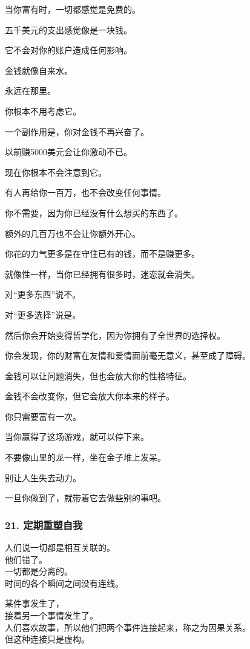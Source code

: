 \documentclass[
]{article}
\begin{document}
当你富有时，一切都感觉是免费的。

五千美元的支出感觉像是一块钱。

它不会对你的账户造成任何影响。

金钱就像自来水。

永远在那里。

你根本不用考虑它。

一个副作用是，你对金钱不再兴奋了。

以前赚5000美元会让你激动不已。

现在你根本不会注意到它。

有人再给你一百万，也不会改变任何事情。

你不需要，因为你已经没有什么想买的东西了。

额外的几百万也不会让你额外开心。

你花的力气更多是在守住已有的钱，而不是赚更多。

就像性一样，当你已经拥有很多时，迷恋就会消失。

对``更多东西''说不。

对``更多选择''说是。

然后你会开始变得哲学化，因为你拥有了全世界的选择权。

你会发现，你的财富在友情和爱情面前毫无意义，甚至成了障碍。

金钱可以让问题消失，但也会放大你的性格特征。

金钱不会改变你，但它会放大你本来的样子。

你只需要富有一次。

当你赢得了这场游戏，就可以停下来。

不要像山里的龙一样，坐在金子堆上发呆。

别让人生失去动力。

一旦你做到了，就带着它去做些别的事吧。

\subsubsection{21.
定期重塑自我}\label{21-ux5b9aux671fux91cdux5851ux81eaux6211}

人们说一切都是相互关联的。\\
他们错了。\\
一切都是分离的。\\
时间的各个瞬间之间没有连线。

某件事发生了，\\
接着另一个事情发生了。\\
人们喜欢故事，所以他们把两个事件连接起来，称之为因果关系。\\
但这种连接只是虚构。
\end{document}
